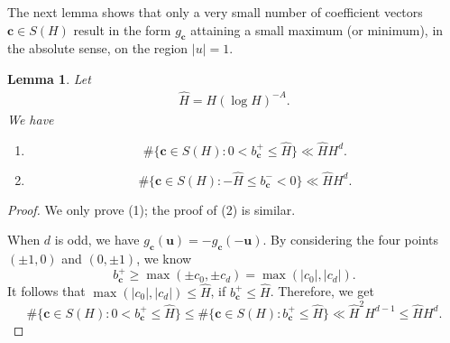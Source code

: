 \documentclass[reqno, 11pt]{amsart}
\renewcommand{\leq}{\leqslant}
\renewcommand{\geq}{\geqslant}
\newtheorem{lemma}[theorem]{Lemma}
\theoremstyle{definition}
\theoremstyle{definition}
\renewcommand{\geq}{\geqslant}
\renewcommand{\leq}{\leqslant}
\newcommand{\cc}{\mathbf{c}}
\newcommand{\uu}{\mathbf{u}}
\numberwithin{equation}{section}
\begin{document}
The next lemma shows that only a very small number of coefficient vectors $\cc \in S(H)$ result in the form $g_\cc$ attaining a small maximum (or minimum), in the absolute sense, on the region $|u| = 1$.
\begin{lemma}\label{Lemma-5.2}
    Let
\begin{align}\label{def-hat-A}
	\hat{H} = H(\log H)^{-A}.
\end{align}
    We have
    \begin{enumerate}
        \item $$\#\{\cc \in S(H): 0 < b^+_\cc \leq \hat{H} \} \ll \hat{H}H^{d}.$$
        \item $$\#\{\cc \in S(H): -\hat{H} \leq b^-_\cc < 0 \} \ll \hat{H}H^{d}.$$
    \end{enumerate}
\end{lemma}
\begin{proof}
We only prove (1); the proof of (2) is similar.


When $d$ is odd, we have $g_\cc(\uu) = -g_{\cc}(-\uu)$. By considering the four points $(\pm 1, 0)$ and $(0, \pm 1)$, we know
$$b^+_\cc \geq \max(\pm c_0, \pm c_d) = \max(|c_0|, |c_d|).$$ 
It follows that $\max(|c_0|, |c_d|) \leq \hat{H}$, if $b^+_\cc \leq \hat{H}$. Therefore, we get
$$\#\{\cc \in S(H): 0 < b^+_\cc \leq \hat{H} \} \leq \#\{\cc \in S(H): b^+_\cc \leq \hat{H} \} \ll \hat{H}^2 H^{d-1} \leq \hat{H}H^{d}.$$


\end{proof}
\end{document}
